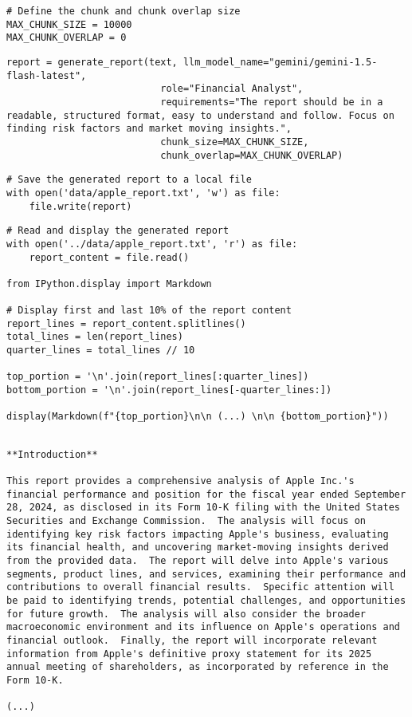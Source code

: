 \begin{verbatim}
# Define the chunk and chunk overlap size
MAX_CHUNK_SIZE = 10000
MAX_CHUNK_OVERLAP = 0
\end{verbatim}

\begin{verbatim}
report = generate_report(text, llm_model_name="gemini/gemini-1.5-flash-latest", 
                           role="Financial Analyst", 
                           requirements="The report should be in a readable, structured format, easy to understand and follow. Focus on finding risk factors and market moving insights.",
                           chunk_size=MAX_CHUNK_SIZE, 
                           chunk_overlap=MAX_CHUNK_OVERLAP)
\end{verbatim}

\begin{verbatim}
# Save the generated report to a local file
with open('data/apple_report.txt', 'w') as file:
    file.write(report)
\end{verbatim}

\begin{verbatim}
# Read and display the generated report
with open('../data/apple_report.txt', 'r') as file:
    report_content = file.read()
    
from IPython.display import Markdown

# Display first and last 10% of the report content
report_lines = report_content.splitlines()
total_lines = len(report_lines)
quarter_lines = total_lines // 10

top_portion = '\n'.join(report_lines[:quarter_lines])
bottom_portion = '\n'.join(report_lines[-quarter_lines:])

display(Markdown(f"{top_portion}\n\n (...) \n\n {bottom_portion}"))
\end{verbatim}

\begin{verbatim}

**Introduction**

This report provides a comprehensive analysis of Apple Inc.'s financial performance and position for the fiscal year ended September 28, 2024, as disclosed in its Form 10-K filing with the United States Securities and Exchange Commission.  The analysis will focus on identifying key risk factors impacting Apple's business, evaluating its financial health, and uncovering market-moving insights derived from the provided data.  The report will delve into Apple's various segments, product lines, and services, examining their performance and contributions to overall financial results.  Specific attention will be paid to identifying trends, potential challenges, and opportunities for future growth.  The analysis will also consider the broader macroeconomic environment and its influence on Apple's operations and financial outlook.  Finally, the report will incorporate relevant information from Apple's definitive proxy statement for its 2025 annual meeting of shareholders, as incorporated by reference in the Form 10-K.

(...)
\end{verbatim}


